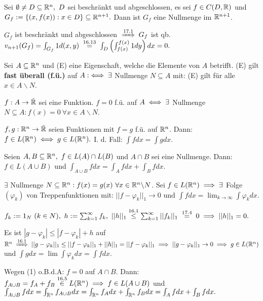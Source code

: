 \documentclass[a4paper,twoside,DIV15,BCOR12mm]{scrbook}
\begin{document}
\begin{satz}
Sei $\emptyset \ne D \subseteq \MdR^n,\ D$ sei beschränkt und abgeschlossen, es sei $f\in C(D,\mathbb{R})$ und $G_f:=\{(x,f(x)):x\in D\}\subseteq\mathbb{R}^{n+1}.$ Dann ist $G_f$ eine Nullmenge im $\mathbb{R}^{n+1}$.
\end{satz}

\begin{beweis}
$G_f$ ist beschränkt und abgeschlossen $\folgtnach{17.1} G_f$ ist qb. $v_{n+1}(G_f) = \int_{G_f}1d(x,y) \gleichnach{16.13} \int_D\left(\int_{f(x)}^{f(x)}1dy\right) dx = 0.$
\end{beweis}

\begin{definition}
Sei $A\subseteq\mathbb{R}^n$ und (E) eine Eigenschaft, welche die Elemente von $A$ betrifft. (E) gilt \textbf{fast überall (f.ü.)} auf $A :\iff \exists$ Nullmenge $N\subseteq A$ mit: (E) gilt für alle $x\in A\backslash N$.
\end{definition}

\begin{beispiel}
$f:A\to\tilde{\mathbb{R}}$ sei eine Funktion. $f=0$ f.ü. auf $A \iff \exists$ Nullmenge $N\subseteq A:f(x)=0\ \forall x\in A\backslash N$.
\end{beispiel}

\begin{satz}
\begin{liste}
\item $f,g:\mathbb{R}^n\to\tilde{\mathbb{R}}$ seien Funktionen mit $f=g$ f.ü. auf $\mathbb{R}^n$. Dann: $f\in L(\mathbb{R}^n) \iff g\in L(\mathbb{R}^n).$ I. d. Fall: $\int fdx = \int gdx$.
\item Seien $A,B \subseteq\mathbb{R}^n,\ f\in L(A)\cap L(B)$ und $A\cap B$ sei eine Nullmenge. Dann: $f\in L(A\cup B)$ und $\int_{A\cup B}fdx = \int_A fdx + \int_B fdx$.
\end{liste}
\end{satz}

\begin{beweis}
\begin{liste}
\item $\exists$ Nullmenge $N\subseteq\mathbb{R}^n:f(x)=g(x)\ \forall x\in\mathbb{R}^n\backslash N$. Sei $f\in L(\mathbb{R}^n) \implies \exists$ Folge $(\varphi_k)$ von Treppenfunktionen mit: $||f-\varphi_k||_1 \to 0$ und $\int fdx = \lim_{k\to\infty} \int\varphi_k dx.$

$f_k:=1_N\ (k\in N),\ h:=\sum_{k=1}^\infty f_k,\ ||h||_1 \overset{\text{16.1}}{\le} \sum_{k=1}^\infty ||f_k||_1 \gleichnach{17.4} 0 \folgt ||h||_1 = 0.$

Es ist $|g-\varphi_k|\le|f-\varphi_k|+h$ auf $\MdR^n \folgtnach{16.1} ||g-\varphi_k||_1\le||f-\varphi_k||_1+||h||_1 = ||f-\varphi_k||_1 \folgt ||g-\varphi_k||_1 \to 0 \folgt g\in L(\MdR^n)$ und $\int gdx = \lim\int\varphi_k dx = \int fdx.$

\item Wegen (1) o.B.d.A: $f=0$ auf $A\cap B$. Dann: $f_{A\cup B} = f_A+f_B \overset{\text{16.5}}\in L(\mathbb{R}^n) \implies f\in L(A\cup B)$ und $\int_{A\cup B} fdx = \int_{\mathbb{R}^n} f_{A\cup B} dx = \int_{\mathbb{R}^n} f_A dx + \int_{\mathbb{R}^n} f_B dx = \int_A fdx + \int_B fdx.$
\end{liste}
\end{beweis}
\end{document}
